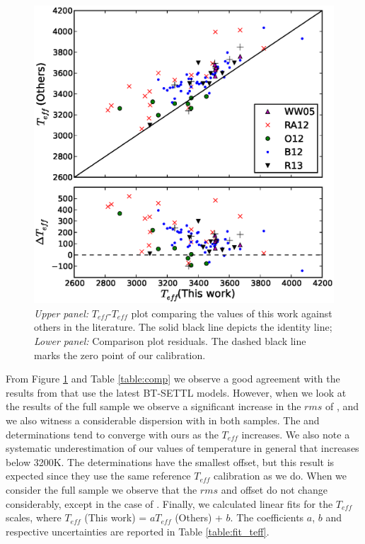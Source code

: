 \documentclass{aa}
\begin{document}
\begin{figure}[]
\begin{center}
\includegraphics[scale=0.5]{pics/compteffv3.eps}
\end{center}
\caption{\textit{Upper panel:} $T_{eff}$-$T_{eff}$ plot comparing the values of this work against others in the literature. The solid black line depicts the identity line; \textit{Lower panel:} Comparison plot residuals. The dashed black line marks the zero point of our calibration.}
\label{fig:compteff}
\end{figure}

From Figure \ref{fig:compteff} and Table \ref{table:comp} we observe a good agreement with the results from \citet{Rajpurohit-2013a} that use the latest BT-SETTL models. However, when we look at the results of the full sample we observe a significant increase in the $rms$ of \citet{Rajpurohit-2013a}, and we also witness a considerable dispersion with \citet{Rojas-Ayala-2012} in both samples. The \citet{Onehag-2012} and \citet{Boyajian-2012} determinations tend to converge with ours as the $T_{eff}$ increases. 
We also note a systematic underestimation of our values of temperature in general that increases below 3200K. The \citet{Onehag-2012} determinations have the smallest offset, but this result is expected since they use the same reference $T_{eff}$ calibration as we do. When we consider the full sample we observe that the $rms$ and offset do not change considerably, except in the case of \citet{Rajpurohit-2013a}.
Finally, we calculated linear fits for the $T_{eff}$ scales, where $T_{eff}$ (This work) = $aT_{eff}$ (Others) + $b$. The coefficients $a$, $b$ and respective uncertainties are reported in Table \ref{table:fit_teff}.
\end{document}
